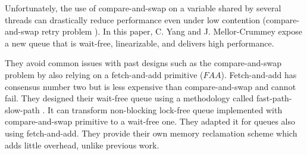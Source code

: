  Unfortunately, the use of compare-and-swap on a variable
shared by several threads can drastically reduce performance even under low
contention (compare-and-swap retry problem
\cite{Morrison:2013:FCQ:2517327.2442527}). In this paper, C. Yang and J.
Mellor-Crummey expose a new queue that is wait-free, linearizable, and delivers
high performance.

They avoid common issues with past designs such as the compare-and-swap problem
by also relying on a fetch-and-add primitive ($FAA$). Fetch-and-add has
consensus number two but is less expensive than compare-and-swap and cannot
fail. They designed their wait-free queue using a methodology called
fast-path-slow-path \cite{Kogan:2012:MCF:2370036.2145835}. It can transform
non-blocking lock-free queue implemented with compare-and-swap primitive to a
wait-free one. They adapted it for queues also using fetch-and-add. They provide
their own memory reclamation scheme which adds little overhead, unlike previous
work.
